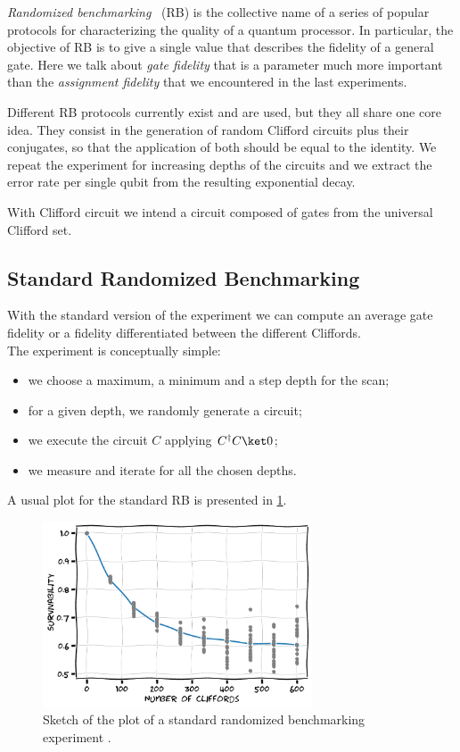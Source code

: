 
\textit{Randomized benchmarking}~\cite{Magesan2012, Kelly2014, Proctor2019, Chow2009} (RB) is the collective name of a series of popular protocols for characterizing the quality of a quantum processor.
In particular, the objective of RB is to give a single value that describes the fidelity of a general gate.
Here we talk about \textit{gate fidelity} that is a parameter much more important than the \textit{assignment fidelity} that we encountered in the last experiments.

Different RB protocols currently exist and are used, but they all share one core idea.
They consist in the generation of random Clifford circuits plus their conjugates, so that the application of both should be equal to the identity.
We repeat the experiment for increasing depths of the circuits and we extract the error rate per single qubit from the resulting exponential decay.

With Clifford circuit we intend a circuit composed of gates from the universal Clifford set.

\subsection*{Standard Randomized Benchmarking}

With the standard version of the experiment we can compute an average gate fidelity or a fidelity differentiated between the different Cliffords.\\
The experiment is conceptually simple:
\begin{itemize}
    \item we choose a maximum, a minimum and a step depth for the scan;
    \item for a given depth, we randomly generate a circuit;
    \item we execute the circuit $C$ applying $C^\dagger C \ket 0$;
    \item we measure and iterate for all the chosen depths.
\end{itemize}

A usual plot for the standard RB is presented in \cref{fig:sketch_rb}.
\begin{figure}[ht]
    \centering
    \includegraphics[width=8cm]{characterization/figures/rb_sketch.pdf}
    \caption{Sketch of the plot of a standard randomized benchmarking experiment .}
    \label{fig:sketch_rb}
\end{figure}


